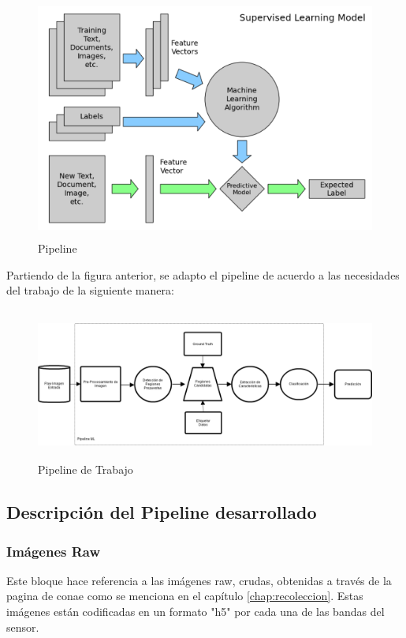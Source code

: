 \begin{figure}[H] \centering
  \includegraphics[height=8cm,keepaspectratio=true,clip=true]{imagenes/tbd/pipeline-sp.png}
  \caption{Pipeline}\label{Fig:pipeline}
\end{figure}

Partiendo de la figura anterior, se adapto el pipeline de acuerdo a las necesidades del trabajo de la siguiente manera:

\begin{figure}[H] \centering
  \includegraphics[height=5cm,keepaspectratio=true,clip=true]{imagenes/tbd/pipeline.png}
  \caption{Pipeline de Trabajo}\label{Fig:pipeline-mio}
\end{figure}

\subsection{Descripción del Pipeline desarrollado}\label{sub:desc-pipeline}

\subsubsection*{Imágenes Raw}
Este bloque hace referencia a las imágenes raw, crudas, obtenidas a través de la pagina de \ac{conae} como se menciona en el capítulo \ref{chap:recoleccion}. Estas imágenes están codificadas en un formato "h5" por cada una de las bandas del sensor.

